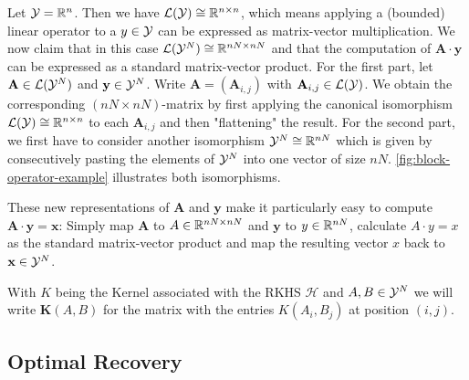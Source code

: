 \begin{example}
	Let $\mathcal{Y} = \mathbb{R}^n$.
	Then we have $\mathcal{L}(\mathcal{Y}) \cong \mathbb{R}^{n\times n}$, which means applying a (bounded) linear operator to a $y \in \mathcal{Y}$ can be expressed as matrix-vector multiplication.
	We now claim that in this case $\mathcal{L}(\mathcal{Y}^N) \cong \mathbb{R}^{nN \times nN}$ and that the computation of $\mathbf{A}\cdot \mathbf{y}$ can be expressed as a standard matrix-vector product.
	For the first part, let $\mathbf{A} \in \mathcal{L}(\mathcal{Y}^N)$ and $\mathbf{y} \in \mathcal{Y}^N$. 
	Write $\mathbf{A} = (\mathbf{A}_{i, j})$ with $\mathbf{A}_{i,j} \in \mathcal{L}(\mathcal{Y})$. 
	We obtain the corresponding $(nN \times nN)$-matrix by first applying the canonical isomorphism $\mathcal{L}(\mathcal{Y}) \cong \mathbb{R}^{n\times n}$ to each $\mathbf{A}_{i,j}$ and then "flattening" the result.
	For the second part, we first have to consider another isomorphism $\mathcal{Y}^N \cong \mathbb{R}^{nN}$ which is given by consecutively pasting the elements of $\mathcal{Y}^N$ into one vector of size $nN$.
	\cref{fig:block-operator-example} illustrates both isomorphisms.
	
	These new representations of $\mathbf{A}$ and $\mathbf{y}$ make it particularly easy to compute $\mathbf{A}\cdot \mathbf{y} = \mathbf{x}$:
	Simply map $\mathbf{A}$ to $A \in \mathbb{R}^{nN \times nN}$ and $\mathbf{y}$ to $y \in \mathbb{R}^{nN}$, calculate $A \cdot y = x$ as the standard matrix-vector product and map the resulting vector $x$ back to $\mathbf{x} \in\mathcal{Y}^N$.	
\end{example}

With $K$ being the Kernel associated with the RKHS $\mathcal{H}$ and $A, B \in \mathcal{Y}^N$ we will write $\mathbf{K}(A, B)$ for the matrix with the entries $K(A_i, B_j)$ at position $(i, j)$.


\subsection{Optimal Recovery}
\label{sec:optimal-recovery}

\begin{theorem}
	\label{theo:representer}
\end{theorem}

